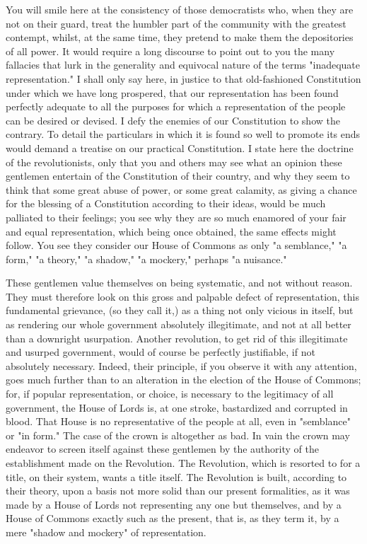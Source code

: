 You will smile here at the consistency of those democratists who, when they are not on their guard, treat the humbler part of the community with the greatest contempt, whilst, at the same time, they pretend to make them the depositories of all power. It would require a long discourse to point out to you the many fallacies that lurk in the generality and equivocal nature of the terms "inadequate representation." I shall only say here, in justice to that old-fashioned Constitution under which we have long prospered, that our representation has been found perfectly adequate to all the purposes for which a representation of the people can be desired or devised. I defy the enemies of our Constitution to show the contrary. To detail the particulars in which it is found so well to promote its ends would demand a treatise on our practical Constitution. I state here the doctrine of the revolutionists, only that you and others may see what an opinion these gentlemen entertain of the Constitution of their country, and why they seem to think that some great abuse of power, or some great calamity, as giving a chance for the blessing of a Constitution according to their ideas, would be much palliated to their feelings; you see why they are so much enamored of your fair and equal representation, which being once obtained, the same effects might follow. You see they consider our House of Commons as only "a semblance," "a form," "a theory," "a shadow," "a mockery," perhaps "a nuisance."

These gentlemen value themselves on being systematic, and not without reason. They must therefore look on this gross and palpable defect of representation, this fundamental grievance, (so they call it,) as a thing not only vicious in itself, but as rendering our whole government absolutely illegitimate, and not at all better than a downright usurpation. Another revolution, to get rid of this illegitimate and usurped government, would of course be perfectly justifiable, if not absolutely necessary. Indeed, their principle, if you observe it with any attention, goes much further than to an alteration in the election of the House of Commons; for, if popular representation, or choice, is necessary to the legitimacy of all government, the House of Lords is, at one stroke, bastardized and corrupted in blood. That House is no representative of the people at all, even in "semblance" or "in form." The case of the crown is altogether as bad. In vain the crown may endeavor to screen itself against these gentlemen by the authority of the establishment made on the Revolution. The Revolution, which is resorted to for a title, on their system, wants a title itself. The Revolution is built, according to their theory, upon a basis not more solid than our present formalities, as it was made by a House of Lords not representing any one but themselves, and by a House of Commons exactly such as the present, that is, as they term it, by a mere "shadow and mockery" of representation.

